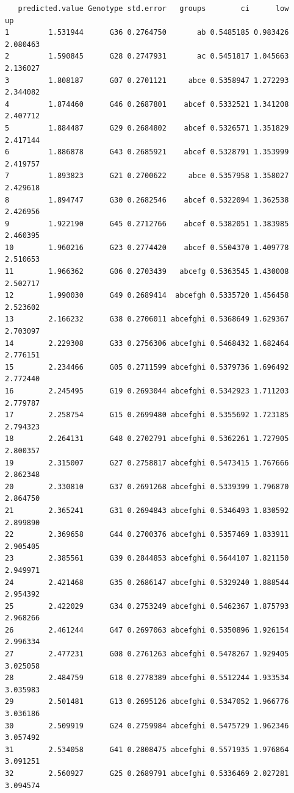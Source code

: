 \documentclass[a4paper, 10pt, fleqn, twosided]{memoir}
\begin{document}
\begin{tcolorbox}[title = Exercise 16 output continued]
\begin{verbatim}
   predicted.value Genotype std.error   groups        ci      low       up
1         1.531944      G36 0.2764750       ab 0.5485185 0.983426 2.080463
2         1.590845      G28 0.2747931       ac 0.5451817 1.045663 2.136027
3         1.808187      G07 0.2701121     abce 0.5358947 1.272293 2.344082
4         1.874460      G46 0.2687801    abcef 0.5332521 1.341208 2.407712
5         1.884487      G29 0.2684802    abcef 0.5326571 1.351829 2.417144
6         1.886878      G43 0.2685921    abcef 0.5328791 1.353999 2.419757
7         1.893823      G21 0.2700622     abce 0.5357958 1.358027 2.429618
8         1.894747      G30 0.2682546    abcef 0.5322094 1.362538 2.426956
9         1.922190      G45 0.2712766    abcef 0.5382051 1.383985 2.460395
10        1.960216      G23 0.2774420    abcef 0.5504370 1.409778 2.510653
11        1.966362      G06 0.2703439   abcefg 0.5363545 1.430008 2.502717
12        1.990030      G49 0.2689414  abcefgh 0.5335720 1.456458 2.523602
13        2.166232      G38 0.2706011 abcefghi 0.5368649 1.629367 2.703097
14        2.229308      G33 0.2756306 abcefghi 0.5468432 1.682464 2.776151
15        2.234466      G05 0.2711599 abcefghi 0.5379736 1.696492 2.772440
16        2.245495      G19 0.2693044 abcefghi 0.5342923 1.711203 2.779787
17        2.258754      G15 0.2699480 abcefghi 0.5355692 1.723185 2.794323
18        2.264131      G48 0.2702791 abcefghi 0.5362261 1.727905 2.800357
19        2.315007      G27 0.2758817 abcefghi 0.5473415 1.767666 2.862348
20        2.330810      G37 0.2691268 abcefghi 0.5339399 1.796870 2.864750
21        2.365241      G31 0.2694843 abcefghi 0.5346493 1.830592 2.899890
22        2.369658      G44 0.2700376 abcefghi 0.5357469 1.833911 2.905405
23        2.385561      G39 0.2844853 abcefghi 0.5644107 1.821150 2.949971
24        2.421468      G35 0.2686147 abcefghi 0.5329240 1.888544 2.954392
25        2.422029      G34 0.2753249 abcefghi 0.5462367 1.875793 2.968266
26        2.461244      G47 0.2697063 abcefghi 0.5350896 1.926154 2.996334
27        2.477231      G08 0.2761263 abcefghi 0.5478267 1.929405 3.025058
28        2.484759      G18 0.2778389 abcefghi 0.5512244 1.933534 3.035983
29        2.501481      G13 0.2695126 abcefghi 0.5347052 1.966776 3.036186
30        2.509919      G24 0.2759984 abcefghi 0.5475729 1.962346 3.057492
31        2.534058      G41 0.2808475 abcefghi 0.5571935 1.976864 3.091251
32        2.560927      G25 0.2689791 abcefghi 0.5336469 2.027281 3.094574

\end{verbatim}
\end{tcolorbox}
\end{document}
